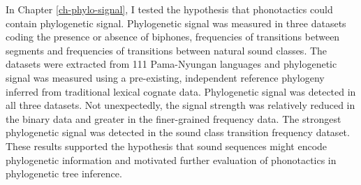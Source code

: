 In Chapter \ref{ch-phylo-signal}, I tested the hypothesis that phonotactics could contain phylogenetic signal. Phylogenetic signal was measured in three datasets coding the presence or absence of biphones, frequencies of transitions between segments and frequencies of transitions between natural sound classes. The datasets were extracted from 111 Pama-Nyungan languages and phylogenetic signal was measured using a pre-existing, independent reference phylogeny inferred from traditional lexical cognate data. Phylogenetic signal was detected in all three datasets. Not unexpectedly, the signal strength was relatively reduced in the binary data and greater in the finer-grained frequency data. The strongest phylogenetic signal was detected in the sound class transition frequency dataset. These results supported the hypothesis that sound sequences might encode phylogenetic information and motivated further evaluation of phonotactics in phylogenetic tree inference.

